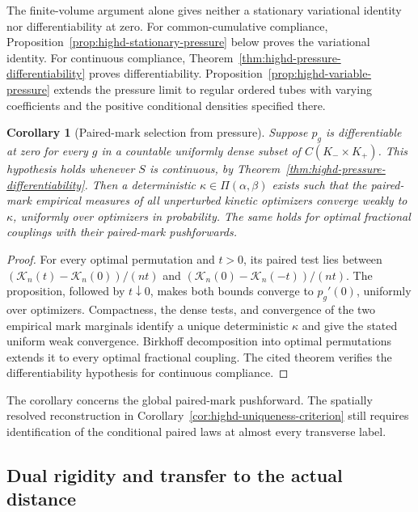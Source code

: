 \documentclass[11pt,reqno]{amsart}
\newtheorem{corollary}[theorem]{Corollary}
\theoremstyle{definition}
\theoremstyle{remark}
\numberwithin{equation}{section}
\begin{document}
The finite-volume argument alone gives neither a stationary variational
identity nor differentiability at zero. For common-cumulative
compliance, Proposition~\ref{prop:highd-stationary-pressure} below
proves the variational identity. For continuous compliance,
Theorem~\ref{thm:highd-pressure-differentiability} proves differentiability.
Proposition~\ref{prop:highd-variable-pressure} extends the pressure limit
to regular ordered tubes with varying coefficients and the positive
conditional densities specified there.

\begin{corollary}[Paired-mark selection from pressure]
\label{cor:highd-pressure-selection}
Suppose \(p_g\) is differentiable at zero for every \(g\) in a
countable uniformly dense subset of \(C(K_-\times K_+)\).
This hypothesis holds whenever \(S\) is continuous, by
Theorem~\ref{thm:highd-pressure-differentiability}. Then a deterministic \(\kappa\in\Pi(\alpha,\beta)\) exists
such that the paired-mark empirical measures of all unperturbed
kinetic optimizers converge weakly to \(\kappa\), uniformly over
optimizers in probability. The same holds for optimal fractional
couplings with their paired-mark pushforwards.
\end{corollary}

\begin{proof}
For every optimal permutation and \(t>0\), its paired test lies
between \((\mathcal K_n(t)-\mathcal K_n(0))/(nt)\) and
\((\mathcal K_n(0)-\mathcal K_n(-t))/(nt)\).
The proposition, followed by \(t\downarrow0\), makes both bounds
converge to \(p_g'(0)\), uniformly over optimizers. Compactness,
the dense tests, and convergence of the two empirical mark
marginals identify a unique deterministic \(\kappa\) and give
the stated uniform weak convergence. Birkhoff decomposition into
optimal permutations extends it to every optimal fractional
coupling. The cited theorem verifies the differentiability hypothesis
for continuous compliance.
\end{proof}

The corollary concerns the global paired-mark pushforward. The
spatially resolved reconstruction in
Corollary~\ref{cor:highd-uniqueness-criterion} still requires
identification of the conditional paired laws at almost every
transverse label.

\subsection{Dual rigidity and transfer to the actual distance}
\label{subsec:highd-dual-transfer}
\end{document}
